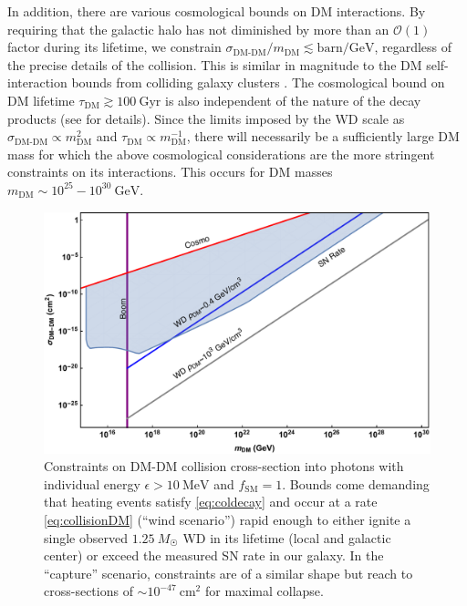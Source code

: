 \documentclass[twocolumn, preprintnumbers,amsmath,amssymb,prd, superscriptaddress]{revtex4}
\newcommand{\OO}{\mathcal{O}}
\newcommand{\GeV}{\text{GeV}}
\newcommand{\cm}{\text{cm}}
\begin{document}
In addition, there are various cosmological bounds on DM interactions.
By requiring that the galactic halo has not diminished by more than an $\OO(1)$ factor during its lifetime, we constrain $\sigma_\text{DM-DM}/m_\text{DM} \lesssim \text{barn}/\GeV$, regardless of the precise details of the collision.
This is similar in magnitude to the DM self-interaction bounds from colliding galaxy clusters \cite{Randall:2007ph}.
The cosmological bound on DM lifetime $\tau_\text{DM} \gtrsim 100 ~\text{Gyr}$ is also independent of the nature of the decay products (see \cite{Poulin:2016nat} for details).
Since the limits imposed by the WD scale as $\sigma_\text{DM-DM} \propto m_\text{DM}^2$ and $\tau_\text{DM} \propto m_\text{DM}^{-1}$, there will necessarily be a sufficiently large DM mass for which the above cosmological considerations are the more stringent constraints on its interactions.
This occurs for DM masses $m_\text{DM} \sim 10^{25} - 10^{30} ~\GeV$.


\begin{figure}
\includegraphics[scale=.3]{collisionobservation.pdf}
\caption{Constraints on DM-DM collision cross-section into photons with individual energy $\epsilon > 10~\text{MeV}$ and $f_\text{SM} = 1$. Bounds come demanding that heating events satisfy \eqref{eq:coldecay} and occur at a rate \eqref{eq:collisionDM} (``wind scenario'') rapid enough to either ignite a single observed $1.25~M_{\astrosun}$ WD in its lifetime (local and galactic center) or exceed the measured SN rate in our galaxy.  In the ``capture'' scenario, constraints are of a similar shape but reach to cross-sections of $\sim 10^{-47}~\cm^2$ for maximal collapse.}
\label{fig:collisionclasses}
\end{figure}
\end{document}
